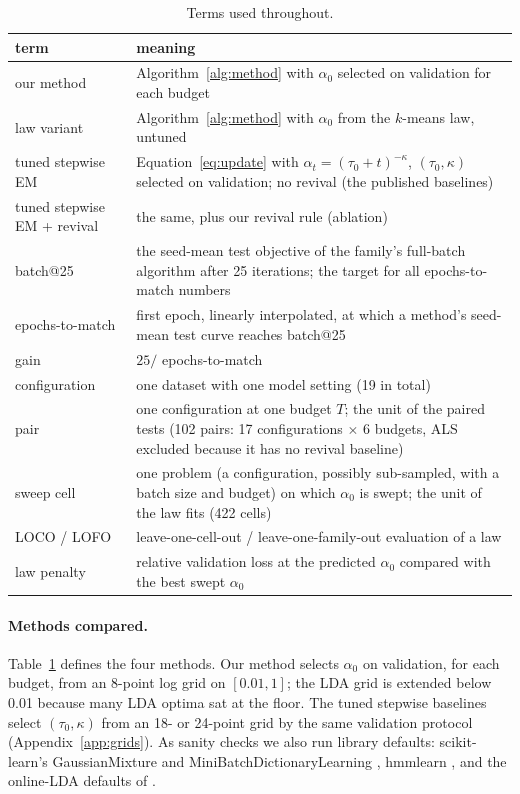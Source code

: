 \documentclass[10pt]{article}
\begin{document}
\begin{table}[!t]
\centering\small
\caption{Terms used throughout.}\label{tab:terms}
\begin{tabular}{p{3.6cm}p{11.2cm}}
\toprule
term & meaning \\
\midrule
our method & Algorithm~\ref{alg:method} with $\alpha_0$ selected on validation for each budget \\
law variant & Algorithm~\ref{alg:method} with $\alpha_0$ from the $k$-means law, untuned \\
tuned stepwise EM & Equation~\ref{eq:update} with $\alpha_t = (\tau_0 + t)^{-\kappa}$, $(\tau_0, \kappa)$ selected on
validation; no revival (the published baselines) \\
tuned stepwise EM + revival & the same, plus our revival rule (ablation) \\
batch@25 & the seed-mean test objective of the family's full-batch algorithm after 25 iterations; the target for
all epochs-to-match numbers \\
epochs-to-match & first epoch, linearly interpolated, at which a method's seed-mean test curve reaches batch@25 \\
gain & $25 /$ epochs-to-match \\
configuration & one dataset with one model setting (19 in total) \\
pair & one configuration at one budget $T$; the unit of the paired tests (102 pairs: 17 configurations $\times$ 6
budgets, ALS excluded because it has no revival baseline) \\
sweep cell & one problem (a configuration, possibly sub-sampled, with a batch size and budget) on which
$\alpha_0$ is swept; the unit of the law fits (422 cells) \\
LOCO / LOFO & leave-one-cell-out / leave-one-family-out evaluation of a law \\
law penalty & relative validation loss at the predicted $\alpha_0$ compared with the best swept $\alpha_0$ \\
\bottomrule
\end{tabular}
\end{table}

\paragraph{Methods compared.} Table~\ref{tab:terms} defines the four methods. Our method selects $\alpha_0$ on
validation, for each budget, from an 8-point log grid on $[0.01, 1]$; the LDA grid is extended below 0.01 because
many LDA optima sat at the floor. The tuned stepwise baselines select $(\tau_0, \kappa)$ from an 18- or 24-point grid by
the same validation protocol (Appendix~\ref{app:grids}). As sanity checks we also run library defaults:
scikit-learn's GaussianMixture and MiniBatchDictionaryLearning \citep{pedregosa2011sklearn}, hmmlearn \citep{hmmlearn},
and the online-LDA defaults of \citet{hoffman2010online}.
\end{document}
